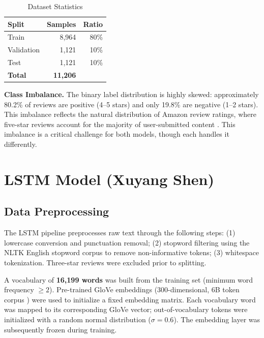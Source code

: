 \documentclass[11pt, a4paper]{article}
\begin{document}
\begin{table}[h]
\centering
\caption{Dataset Statistics}
\begin{tabular}{lrr}
\toprule
\textbf{Split} & \textbf{Samples} & \textbf{Ratio} \\
\midrule
Train      & 8,964 & 80\% \\
Validation & 1,121 & 10\% \\
Test       & 1,121 & 10\% \\
\midrule
\textbf{Total} & \textbf{11,206} & \\
\bottomrule
\end{tabular}
\end{table}

\textbf{Class Imbalance.} The binary label distribution is highly skewed: approximately 80.2\% of reviews are positive (4--5 stars) and only 19.8\% are negative (1--2 stars). This imbalance reflects the natural distribution of Amazon review ratings, where five-star reviews account for the majority of user-submitted content \cite{mcauley2016ups}. This imbalance is a critical challenge for both models, though each handles it differently.

\section{LSTM Model (Xuyang Shen)}

\subsection{Data Preprocessing}

The LSTM pipeline preprocesses raw text through the following steps: (1) lowercase conversion and punctuation removal; (2) stopword filtering using the NLTK English stopword corpus to remove non-informative tokens; (3) whitespace tokenization. Three-star reviews were excluded prior to splitting.

A vocabulary of \textbf{16,199 words} was built from the training set (minimum word frequency $\geq 2$). Pre-trained GloVe embeddings (300-dimensional, 6B token corpus \cite{pennington2014glove}) were used to initialize a fixed embedding matrix. Each vocabulary word was mapped to its corresponding GloVe vector; out-of-vocabulary tokens were initialized with a random normal distribution ($\sigma = 0.6$). The embedding layer was subsequently frozen during training.
\end{document}
